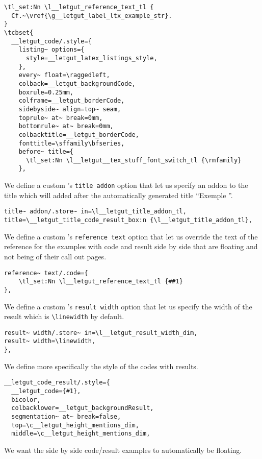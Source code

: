 \documentclass{letgut}
\begin{document}
\begin{lstlisting}
\tl_set:Nn \l__letgut_reference_text_tl {
  Cf.~\vref{\g__letgut_label_ltx_example_str}.
}
\tcbset{
  __letgut_code/.style={
    listing~ options={
      style=__letgut_latex_listings_style,
    },
    every~ float=\raggedleft,
    colback=__letgut_backgroundCode,
    boxrule=0.25mm,
    colframe=__letgut_borderCode,
    sidebyside~ align=top~ seam,
    toprule~ at~ break=0mm,
    bottomrule~ at~ break=0mm,
    colbacktitle=__letgut_borderCode,
    fonttitle=\sffamily\bfseries,
    before~ title={
      \tl_set:Nn \l__letgut__tex_stuff_font_switch_tl {\rmfamily}
    },
\end{lstlisting}
We define a custom 's \lstinline+title addon+ option that let us
specify an addon to the title which will added after the automatically
generated title “Exemple ”.
\begin{lstlisting}
title~ addon/.store~ in=\l__letgut_title_addon_tl,
title=\__letgut_title_code_result_box:n {\l__letgut_title_addon_tl},
\end{lstlisting}
We define a custom 's \lstinline+reference text+ option that let us
override the text of the reference for the examples with code and result side by
side that are floating and not being of their call out pages.
\begin{lstlisting}
reference~ text/.code={
    \tl_set:Nn \l__letgut_reference_text_tl {##1}
},
\end{lstlisting}
We define a custom 's \lstinline+result width+ option that let us
specify the width of the result which is \lstinline+\linewidth+ by default.
\begin{lstlisting}
result~ width/.store~ in=\l__letgut_result_width_dim,
result~ width=\linewidth,
},
\end{lstlisting}
We define more specifically the style of the codes with results.
\begin{lstlisting}
__letgut_code_result/.style={
  __letgut_code={#1},
  bicolor,
  colbacklower=__letgut_backgroundResult,
  segmentation~ at~ break=false,
  top=\c__letgut_height_mentions_dim,
  middle=\c__letgut_height_mentions_dim,
\end{lstlisting}
We want the side by side code/result examples to automatically be floating.
\end{document}
